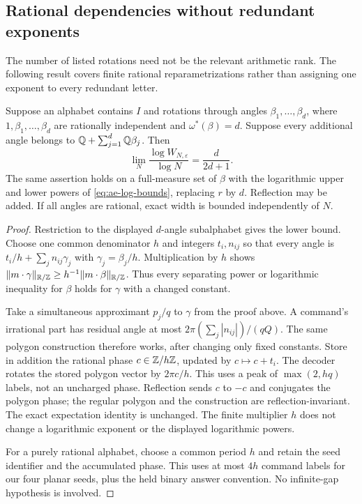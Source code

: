 \subsection{Rational dependencies without redundant exponents}
The number of listed rotations need not be the relevant arithmetic rank. The following result covers finite rational reparametrizations rather than assigning one exponent to every redundant letter.

\begin{corollary}\label{cor:rational-extension}
Suppose an alphabet contains $I$ and rotations through angles $\beta_1,\ldots,\beta_d$, where $1,\beta_1,\ldots,\beta_d$ are rationally independent and $\omega^*(\beta)=d$. Suppose every additional angle belongs to $\mathbb Q+\sum_{j=1}^d\mathbb Q\beta_j$. Then
\[
       \lim_N\frac{\log W_{N,\varepsilon}}{\log N}=\frac{d}{2d+1}.
\]
The same assertion holds on a full-measure set of $\beta$ with the logarithmic upper and lower powers of \eqref{eq:ae-log-bounds}, replacing $r$ by $d$. Reflection may be added. If all angles are rational, exact width is bounded independently of $N$.
\end{corollary}
\begin{proof}
Restriction to the displayed $d$-angle subalphabet gives the lower bound. Choose one common denominator $h$ and integers $t_i,n_{ij}$ so that every angle is
$t_i/h+\sum_jn_{ij}\gamma_j$ with $\gamma_j=\beta_j/h$. Multiplication by $h$ shows
$\lVert m\cdot\gamma\rVert_{\mathbb R/\mathbb Z}\ge h^{-1}\lVert m\cdot\beta\rVert_{\mathbb R/\mathbb Z}$.
Thus every separating power or logarithmic inequality for $\beta$ holds for $\gamma$ with a changed constant.

Take a simultaneous approximant $p_j/q$ to $\gamma$ from the proof above. A command's irrational part has residual angle at most
$2\pi(\sum_j|n_{ij}|)/(qQ)$. The same polygon construction therefore works, after changing only fixed constants. Store in addition the rational phase $c\in\mathbb Z/h\mathbb Z$, updated by $c\mapsto c+t_i$. The decoder rotates the stored polygon vector by $2\pi c/h$. This uses a peak of $\max(2,hq)$ labels, not an uncharged phase. Reflection sends $c$ to $-c$ and conjugates the polygon phase; the regular polygon and the construction are reflection-invariant. The exact expectation identity is unchanged. The finite multiplier $h$ does not change a logarithmic exponent or the displayed logarithmic powers.

For a purely rational alphabet, choose a common period $h$ and retain the seed identifier and the accumulated phase. This uses at most $4h$ command labels for our four planar seeds, plus the held binary answer convention. No infinite-gap hypothesis is involved.
\end{proof}
